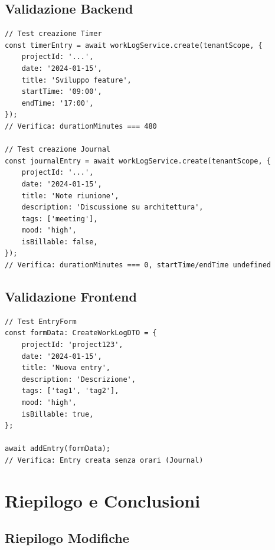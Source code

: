 \documentclass[11pt,a4paper]{article}
\begin{document}
\subsection{Validazione Backend}

\begin{lstlisting}[caption=Test Backend]
// Test creazione Timer
const timerEntry = await workLogService.create(tenantScope, {
    projectId: '...',
    date: '2024-01-15',
    title: 'Sviluppo feature',
    startTime: '09:00',
    endTime: '17:00',
});
// Verifica: durationMinutes === 480

// Test creazione Journal
const journalEntry = await workLogService.create(tenantScope, {
    projectId: '...',
    date: '2024-01-15',
    title: 'Note riunione',
    description: 'Discussione su architettura',
    tags: ['meeting'],
    mood: 'high',
    isBillable: false,
});
// Verifica: durationMinutes === 0, startTime/endTime undefined
\end{lstlisting}

\subsection{Validazione Frontend}

\begin{lstlisting}[caption=Test Frontend]
// Test EntryForm
const formData: CreateWorkLogDTO = {
    projectId: 'project123',
    date: '2024-01-15',
    title: 'Nuova entry',
    description: 'Descrizione',
    tags: ['tag1', 'tag2'],
    mood: 'high',
    isBillable: true,
};

await addEntry(formData);
// Verifica: Entry creata senza orari (Journal)
\end{lstlisting}

\section{Riepilogo e Conclusioni}

\subsection{Riepilogo Modifiche}
\end{document}
